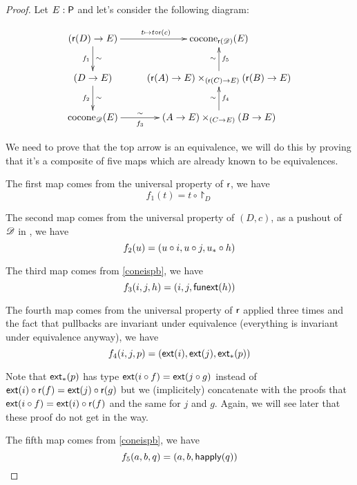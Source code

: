 \begin{proof}
  Let $E:\P$ and let’s consider the following diagram:

  \[\xymatrix{ (\reflect(D)\to E)
    \ar^{t\mapsto{}\composecocone{t}{\reflect(c)}}[r] \ar_{f_1}^\sim[d]
    &
    \cocone{\reflect(\Ddiag)}{E}\\
    (D\to E) \ar_{f_2}^\sim[d] &
    (\reflect(A)\to{}E)\times_{(\reflect(C)\to{}E)}(\reflect(B)\to{}E)
    \ar_{f_5}^\sim[u] \\
    \cocone{\Ddiag}{E}\ar_-{f_3}^-\sim[r] & (A\to{}E)\times_{(C\to{}E)}(B\to{}E)
    \ar_{f_4}^\sim[u] }\]

  We need to prove that the top arrow is an equivalence, we will do this by
  proving that it’s a composite of five maps which are already known to be
  equivalences.

  The first map comes from the universal property of $\reflect$, we have
  \[f_1(t)=t\circ\project_D\]

  The second map comes from the universal property of $(D,c)$, as a pushout of
  $\Ddiag$ in \type, we have
  \[f_2(u)=(u\circ{}i,u\circ{}j,\mapfunc{u}\circ{}h)\]

  The third map comes from \autoref{coneispb}, we have
  \[f_3(i,j,h)=(i,j,\funext(h))\]

  The fourth map comes from the universal property of $\reflect$ applied three
  times and the fact that pullbacks are invariant under equivalence (everything
  is invariant under equivalence anyway), we have
  \[f_4(i,j,p)=(\ext(i),\ext(j),\mapfunc{\ext}(p))\]

  Note that $\mapfunc{\ext}(p)$ has type $\ext(i\circ{}f)=\ext(j\circ{}g)$
  instead of $\ext(i)\circ\reflect(f)=\ext(j)\circ\reflect(g)$ but we
  (implicitely) concatenate with the proofs that
  $\ext(i\circ{}f)=\ext(i)\circ\reflect(f)$ and the same for $j$ and $g$. Again,
  we will see later that these proof do not get in the way.

  The fifth map comes from \autoref{coneispb}, we have
  \[f_5(a,b,q)=(a,b,\happly(q))\]


\end{proof}
